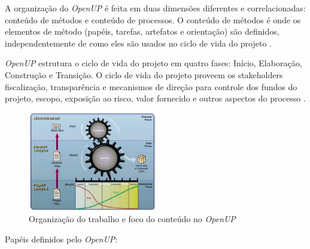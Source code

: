 \documentclass{acm_proc_article-sp}
\begin{document}
A organização do \textit{OpenUP} é feita em  duas dimensões diferentes e correlacionadas: conteúdo de métodos e conteúdo de processos. O conteúdo de métodos é onde os elementos de método (papéis, tarefas, artefatos e orientação) são definidos, independentemente de como eles são usados no ciclo de vida do projeto \cite{openUP:agil}.

\textit{OpenUP} estrutura o ciclo de vida do projeto em quatro fases: Início, Elaboração, Construção e Transição. O ciclo de vida do projeto proveem os stakeholders fiscalização, transparência e mecanismos de direção para controle dos fundos do projeto, escopo, exposição ao risco, valor fornecido e outros aspectos do processo \cite{openUP:agil}.

\begin{figure}[h]
\centering %
\includegraphics[width=0.5\textwidth]{organizacaoTrabOpenUP.JPG} %
\caption{Organização do trabalho e foco do conteúdo no \textit{OpenUP} \cite{openUP:agil}}
\end{figure}

Papéis definidos pelo \textit{OpenUP}:
\end{document}
